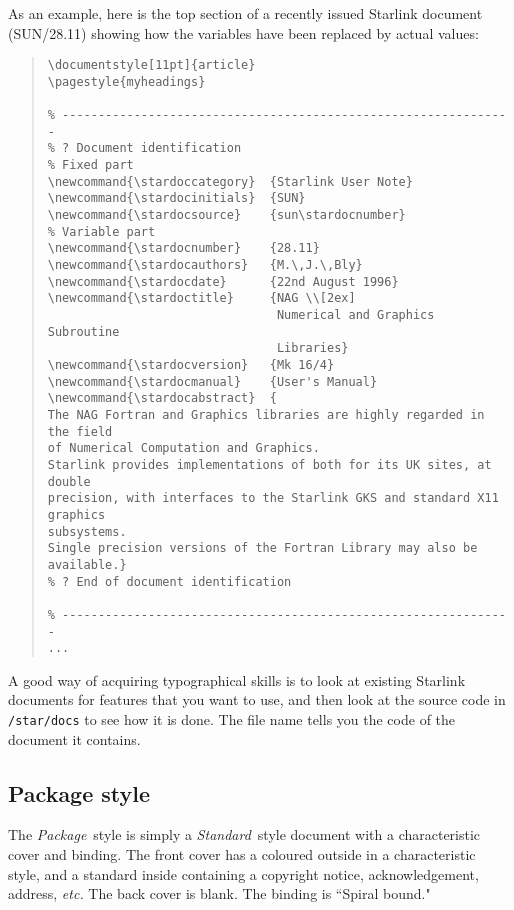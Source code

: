 \documentclass[twoside,11pt]{article}
\newcommand{\stardoccategory}  {Starlink General Paper}
\newcommand{\stardocinitials}  {SGP}
\newcommand{\stardocsource}    {sgp\stardocnumber}
\newcommand{\stardocnumber}    {50.3}
\newcommand{\stardocauthors}   {M D Lawden}
\newcommand{\stardocdate}      {20 November 1997}
\newcommand{\stardoctitle}     {Starlink Document Styles}
\newcommand{\stardocabstract}  {
This document describes the various styles which are recommended for Starlink
documents.
It also explains how to use the templates which are provided by
Starlink to help authors create documents in a standard style.
\par
This paper is concerned mainly with conveying the ``look and feel" of the
various styles of Starlink document rather than describing the technical
details of how to produce them.
Other Starlink papers give recommendations for the detailed
aspects of document production, design, layout, and typography.
\par
The only style that is likely to be used by most Starlink authors is the
{\em Standard}\, style, described in section~\ref{standard_style}.}
\newcommand{\xlabel}[1]{}
\begin{document}
As an example, here is the top section of a recently issued Starlink document
(SUN/28.11) showing how the variables have been replaced by actual values:

\begin{quote}
\begin{verbatim}
\documentstyle[11pt]{article}
\pagestyle{myheadings}

% ---------------------------------------------------------------
% ? Document identification
% Fixed part
\newcommand{\stardoccategory}  {Starlink User Note}
\newcommand{\stardocinitials}  {SUN}
\newcommand{\stardocsource}    {sun\stardocnumber}
% Variable part
\newcommand{\stardocnumber}    {28.11}
\newcommand{\stardocauthors}   {M.\,J.\,Bly}
\newcommand{\stardocdate}      {22nd August 1996}
\newcommand{\stardoctitle}     {NAG \\[2ex]
                                Numerical and Graphics Subroutine
                                Libraries}
\newcommand{\stardocversion}   {Mk 16/4}
\newcommand{\stardocmanual}    {User's Manual}
\newcommand{\stardocabstract}  {
The NAG Fortran and Graphics libraries are highly regarded in the field
of Numerical Computation and Graphics.
Starlink provides implementations of both for its UK sites, at double
precision, with interfaces to the Starlink GKS and standard X11 graphics
subsystems.
Single precision versions of the Fortran Library may also be available.}
% ? End of document identification

% ---------------------------------------------------------------
...
\end{verbatim}
\end{quote}

A good way of acquiring typographical skills is to look at existing Starlink
documents for features that you want to use, and then look at the source
code in {\tt /star/docs} to see how it is done.
The file name tells you the code of the document it contains.

\subsection{\label{package_style}\xlabel{package_style}Package style}

The {\em Package}\, style is simply a {\em Standard}\, style document with a
characteristic cover and binding.
The front cover has a coloured outside in a characteristic style, and a standard
inside containing a copyright notice, acknowledgement, address, {\em etc.}
The back cover is blank.
The binding is ``Spiral bound."
\end{document}
